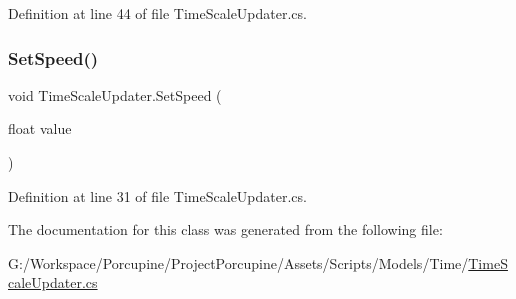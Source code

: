 Definition at line 44 of file Time\+Scale\+Updater.\+cs.

\mbox{\label{class_time_scale_updater_a83538223f680a9196f9c0a27424e24ae}} 
\subsubsection{\texorpdfstring{Set\+Speed()}{SetSpeed()}}
{\footnotesize\ttfamily void Time\+Scale\+Updater.\+Set\+Speed (\begin{DoxyParamCaption}\item[{float}]{value }\end{DoxyParamCaption})}



Definition at line 31 of file Time\+Scale\+Updater.\+cs.



The documentation for this class was generated from the following file\+:\begin{DoxyCompactItemize}
\item 
G\+:/\+Workspace/\+Porcupine/\+Project\+Porcupine/\+Assets/\+Scripts/\+Models/\+Time/\hyperlink{_time_scale_updater_8cs}{Time\+Scale\+Updater.\+cs}\end{DoxyCompactItemize}
